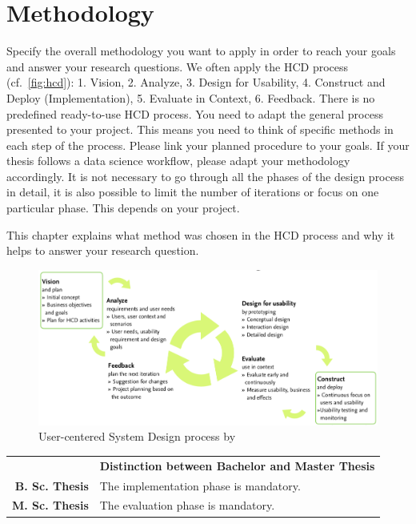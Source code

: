\section{Methodology}
\label{subsec:methodology}
Specify the overall methodology you want to apply in order to reach your goals and answer your research questions. We often apply the HCD process (cf.~\autoref{fig:hcd}): 1. Vision, 2. Analyze, 3. Design for Usability, 4. Construct and Deploy (Implementation), 5. Evaluate in Context, 6. Feedback. There is no predefined ready-to-use HCD process. You need to adapt the general process presented to your project. This means you need to think of specific methods in each step of the process. Please link your planned procedure to your goals. If your thesis follows a data science workflow, please adapt your methodology accordingly. It is not necessary to go through all the phases of the design process in detail, it is also possible to limit the number of iterations or focus on one particular phase. This depends on your project.

This chapter explains what method was chosen in the HCD process and why it helps to answer your research question.

\begin{figure}[h]
  \centering
  \includegraphics[width=\linewidth]{pics/hcd.png}
  \caption{User-centered System Design process by~\cite{gulliksenKeyPrinciplesUsercentred2003}}
\end{figure}

\begin{table}[htb]
\small
\colorbox{bamacolor}{
\centering
\begin{tabularx}{\textwidth}{@{} r Y @{}}
	&
	\textbf{Distinction between Bachelor and Master Thesis}\vspace{2mm}\\
    \textbf{B. Sc. Thesis} &
    The implementation phase is mandatory. \vspace{2mm}\\
	\textbf{M. Sc. Thesis} &
	The evaluation phase is mandatory. \vspace{2mm}\\

\end{tabularx}
}
\end{table}


